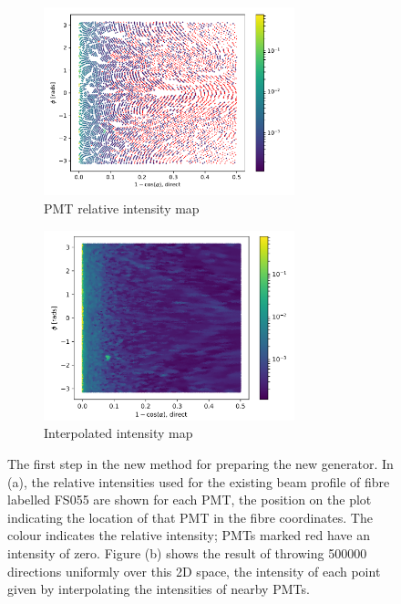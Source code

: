 \begin{figure}
    \centering
    \begin{subfigure}{0.98\textwidth}
        \centering
        \includegraphics[width=0.8\textwidth]{5_SMELLIESimulation/images/flat_plot_r_FS055_beam_profile_original_6-18-13.pdf}
        \caption{PMT relative intensity map}
        \label{fig:esther_beam_profile}
    \end{subfigure}
    \begin{subfigure}{0.98\textwidth}
        \centering
        \includegraphics[width=0.8\textwidth]{5_SMELLIESimulation/images/polar_plot_FS055_MC_sampling_old_beam_profile.png}
        \caption{Interpolated intensity map}
        \label{fig:old_profile_interpolated_sample_plot}
    \end{subfigure}
    \caption{The first step in the new method for preparing the new generator. In (a), the relative intensities used for the existing beam profile of fibre labelled FS055 are shown for each PMT, the position on the plot indicating the location of that PMT in the fibre coordinates. The colour indicates the relative intensity; PMTs marked red have an intensity of zero. Figure (b) shows the result of throwing \num{500000} directions uniformly over this 2D space, the intensity of each point given by interpolating the intensities of nearby PMTs.}
    \label{fig:esther_beam_profile_and_interp}
\end{figure}

